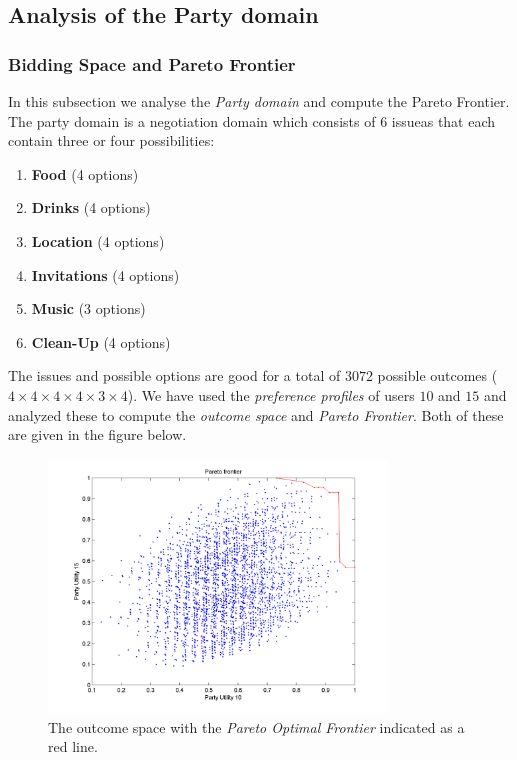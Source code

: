 \documentclass[a4paper,10pt]{article}
\begin{document}
\subsection{Analysis of the Party domain}

\subsubsection{Bidding Space and Pareto Frontier}

In this subsection we analyse the \emph{Party domain} and compute the Pareto Frontier. The party domain is a negotiation domain which consists of $6$ issueas that each contain three or four possibilities: 

\begin{enumerate}[itemsep=0mm]
  \item \textbf{Food} (4 options)
  \item \textbf{Drinks} (4 options)
  \item \textbf{Location} (4 options)
  \item \textbf{Invitations} (4 options)
  \item \textbf{Music} (3 options)
  \item \textbf{Clean-Up} (4 options)
\end{enumerate}

The issues and possible options are good for a total of $3072$ possible outcomes ($4 \times 4 \times 4 \times 4 \times 3 \times 4$). We have used the \emph{preference profiles} of users $10$ and $15$ and analyzed these to compute the \emph{outcome space} and \emph{Pareto Frontier}. Both of these are given in the figure below.

\begin{figure}[H]
\begin{center}
 \includegraphics[width=0.8\textwidth]{pareto.png}
 \caption{The outcome space with the \emph{Pareto Optimal Frontier} indicated as a red line.}
 \label{fig:pareto} 
\end{center}
\end{figure}
\end{document}
